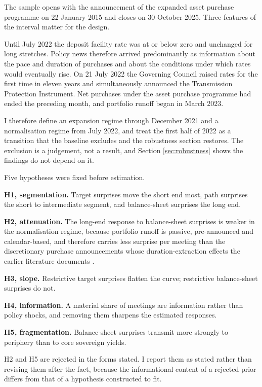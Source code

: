 \documentclass[11pt]{article}
\begin{document}
The sample opens with the announcement of the expanded asset purchase programme
on 22 January 2015 and closes on 30 October 2025. Three features of the interval
matter for the design.

Until July 2022 the deposit facility rate was at or below zero and unchanged for
long stretches. Policy news therefore arrived predominantly as information about
the pace and duration of purchases and about the conditions under which rates
would eventually rise. On 21 July 2022 the Governing Council raised rates for the
first time in eleven years and simultaneously announced the Transmission
Protection Instrument. Net purchases under the asset purchase programme had ended
the preceding month, and portfolio runoff began in March 2023.

I therefore define an expansion regime through December 2021 and a normalisation
regime from July 2022, and treat the first half of 2022 as a transition that the
baseline excludes and the robustness section restores. The exclusion is a
judgement, not a result, and Section \ref{sec:robustness} shows the findings do
not depend on it.

Five hypotheses were fixed before estimation.

\textbf{H1, segmentation.} Target surprises move the short end most, path
surprises the short to intermediate segment, and balance-sheet surprises the long
end.

\textbf{H2, attenuation.} The long-end response to balance-sheet surprises is
weaker in the normalisation regime, because portfolio runoff is passive,
pre-announced and calendar-based, and therefore carries less surprise per meeting
than the discretionary purchase announcements whose duration-extraction
effects the earlier literature documents \citep{krishnamurthy2011,rogers2014}.

\textbf{H3, slope.} Restrictive target surprises flatten the curve; restrictive
balance-sheet surprises do not.

\textbf{H4, information.} A material share of meetings are information rather
than policy shocks, and removing them sharpens the estimated responses.

\textbf{H5, fragmentation.} Balance-sheet surprises transmit more strongly to
periphery than to core sovereign yields.

H2 and H5 are rejected in the forms stated. I report them as stated rather than
revising them after the fact, because the informational content of a rejected
prior differs from that of a hypothesis constructed to fit.
\end{document}
